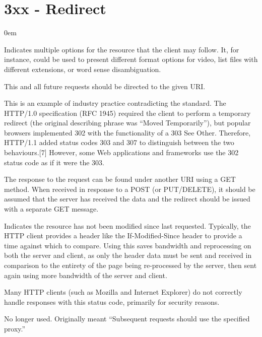 \section{3xx - Redirect}
\begin{description}\itemsep0em
	\item [300 - Multiple Choices] Indicates multiple options for the resource that the client may follow. It, for instance, could be used to present different format options for video, list files with different extensions, or word sense disambiguation.

	\item [301 - Moved Permanently] This and all future requests should be directed to the given URI.

	\item [302 - Found] This is an example of industry practice contradicting the standard. The HTTP/1.0 specification (RFC 1945) required the client to perform a temporary redirect (the original describing phrase was \enquote{Moved Temporarily}), but popular browsers implemented 302 with the functionality of a 303 See Other. Therefore, HTTP/1.1 added status codes 303 and 307 to distinguish between the two behaviours.[7] However, some Web applications and frameworks use the 302 status code as if it were the 303.

	\item [303 - See Other] The response to the request can be found under another URI using a GET method. When received in response to a POST (or PUT/DELETE), it should be assumed that the server has received the data and the redirect should be issued with a separate GET message.

	\item [304 - Not Modified] Indicates the resource has not been modified since last requested. Typically, the HTTP client provides a header like the If-Modified-Since header to provide a time against which to compare. Using this saves bandwidth and reprocessing on both the server and client, as only the header data must be sent and received in comparison to the entirety of the page being re-processed by the server, then sent again using more bandwidth of the server and client.

	\item [305 - Use Proxy] Many HTTP clients (such as Mozilla and Internet Explorer) do not correctly handle responses with this status code, primarily for security reasons.
	
	\item [306 - Switch Proxy] No longer used. Originally meant \enquote{Subsequent requests should use the specified proxy.}


\end{description}
